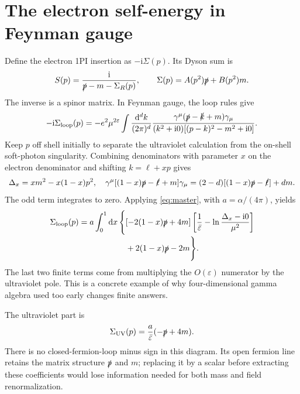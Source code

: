 \documentclass[11pt]{article}
\newcommand{\dd}{\mathrm d}
\newcommand{\ii}{\mathrm i}
\newcommand{\eps}{\varepsilon}
\newcommand{\module}[1]{\clearpage\section{#1}}
\begin{document}
\module{The electron self-energy in Feynman gauge}
Define the electron 1PI insertion as \(-\ii\Sigma(p)\). Its Dyson sum is
\begin{equation}
 S(p)=\frac{\ii}{\slashed p-m-\Sigma_R(p)},\qquad
 \Sigma(p)=A(p^2)\slashed p+B(p^2)m.
 \label{eq:fermiondyson}
\end{equation}
The inverse is a spinor matrix. In Feynman gauge, the loop rules give
\begin{equation}
 -\ii\Sigma_{\rm loop}(p)
 =-e^2\mu^{2\eps}\int\frac{\dd^dk}{(2\pi)^d}
 \frac{\gamma^\mu(\slashed p-\slashed k+m)\gamma_\mu}
 {(k^2+\ii0)[(p-k)^2-m^2+\ii0]}.
\end{equation}
Keep \(p\) off shell initially to separate the ultraviolet calculation
from the on-shell soft-photon singularity. Combining denominators with
parameter \(x\) on the electron denominator and shifting \(k=\ell+xp\)
gives
\begin{equation}
 \Delta_x=xm^2-x(1-x)p^2,\quad
 \gamma^\mu[(1-x)\slashed p-\slashed\ell+m]\gamma_\mu
 =(2-d)[(1-x)\slashed p-\slashed\ell]+dm.
\end{equation}
The odd term integrates to zero. Applying \eqref{eq:master}, with
\(a=\alpha/(4\pi)\), yields
\begin{align}
 \Sigma_{\rm loop}(p)=a\int_0^1\dd x\,\Bigg\{
 &[-2(1-x)\slashed p+4m]
 \left[\frac1{\bar\eps}-\ln\frac{\Delta_x-\ii0}{\mu^2}\right]
 \nonumber\\[-2pt]
 &+2(1-x)\slashed p-2m\Bigg\}.
 \label{eq:selfparameter}
\end{align}
The last two finite terms come from multiplying the \(O(\eps)\) numerator
by the ultraviolet pole. This is a concrete example of why four-dimensional
gamma algebra used too early changes finite answers.

The ultraviolet part is
\begin{equation}
 \Sigma_{\rm UV}(p)=\frac{a}{\bar\eps}(-\slashed p+4m).
\end{equation}
There is no closed-fermion-loop minus sign in this diagram. Its open
fermion line retains the matrix structure \(\slashed p\) and \(m\);
replacing it by a scalar before extracting these coefficients would
lose information needed for both mass and field renormalization.
\end{document}
